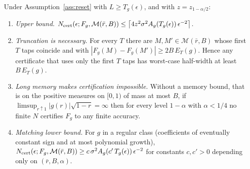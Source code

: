 \begin{theorem}\label{thm:dich}
Under Assumption~\ref{ass:reset} with $L\ge T_g(\epsilon)$, and with $z=z_{1-\alpha/2}$:
\begin{enumerate}[label=(\roman*)]
\item \emph{Upper bound.} $N_{\rm cert}(\epsilon;F_g,\mathcal M(\bar r,B))\le\bigl\lceil4z^2\sigma^2A_g(T_g(\epsilon))\,\epsilon^{-2}\bigr\rceil$. \hfill\Proved
\item \emph{Truncation is necessary.} For every $T$ there are $M,M'\in\mathcal M(\bar r,B)$ whose first $T$ taps coincide and with $|F_g(M)-F_g(M')|\ge2B\,E_T(g)$. Hence any certificate that uses only the first $T$ taps has worst-case half-width at least $B\,E_T(g)$. \hfill\Proved
\item \emph{Long memory makes certification impossible.} Without a memory bound, that is on the positive measures on $[0,1)$ of mass at most $B$, if $\limsup_{r\uparrow1}|g(r)|\sqrt{1-r}=\infty$ then for every level $1-\alpha$ with $\alpha<1/4$ no finite $N$ certifies $F_g$ to any finite accuracy. \hfill\Proved
\item \emph{Matching lower bound.} For $g$ in a regular class (coefficients of eventually constant sign and at most polynomial growth), $N_{\rm cert}(\epsilon;F_g,\mathcal M(\bar r,B))\ge c\,\sigma^2A_g(c'\,T_g(\epsilon))\,\epsilon^{-2}$ for constants $c,c'>0$ depending only on $(\bar r,B,\alpha)$. \hfill\Target
\end{enumerate}
\end{theorem}

